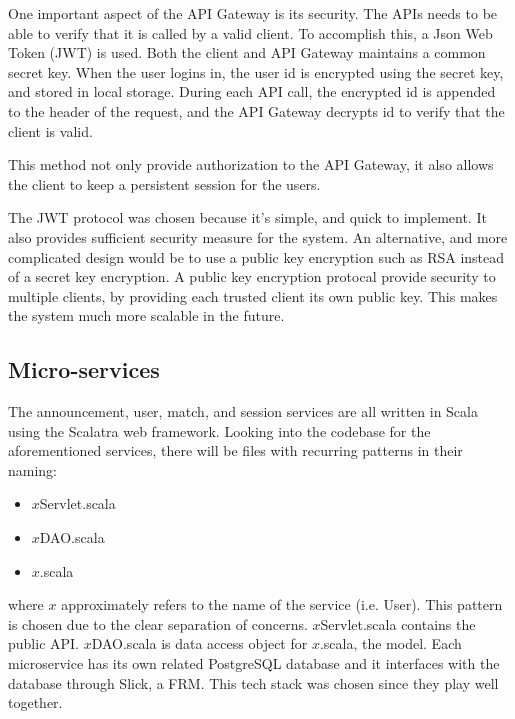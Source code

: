 \documentclass{article}
\begin{document}
One important aspect of the API Gateway is its security. The APIs needs to be able to verify that it is called by a valid client. To accomplish this, a Json Web Token (JWT) is used. Both the client and API Gateway maintains a common secret key. When the user logins in, the user id is encrypted using the secret key, and stored in local storage. During each API call, the encrypted id is appended to the header of the request, and the API Gateway decrypts id to verify that the client is valid.

This method not only provide authorization to the API Gateway, it also allows the client to keep a persistent session for the users.

The JWT protocol was chosen because it's simple, and quick to implement. It also provides sufficient security measure for the system. An alternative, and more complicated design would be to use a public key encryption such as RSA instead of a secret key encryption. A public key encryption protocal provide security to multiple clients, by providing each trusted client its own public key. This makes the system much more scalable in the future.

\subsection{Micro-services}
The announcement, user, match, and session services are all written in Scala using the Scalatra web framework. Looking into the codebase for the aforementioned services, there will be files with recurring patterns in their naming:

\begin{itemize}
  \item $x$Servlet.scala
  \item $x$DAO.scala
  \item $x$.scala
\end{itemize}

where $x$ approximately refers to the name of the service (i.e. User). This pattern is chosen due to the clear separation of concerns. $x$Servlet.scala contains the public API. $x$DAO.scala is data access object for $x$.scala, the model. Each microservice has its own related PostgreSQL database and it interfaces with the database through Slick, a FRM. This tech stack was chosen since they play well together.
\end{document}
